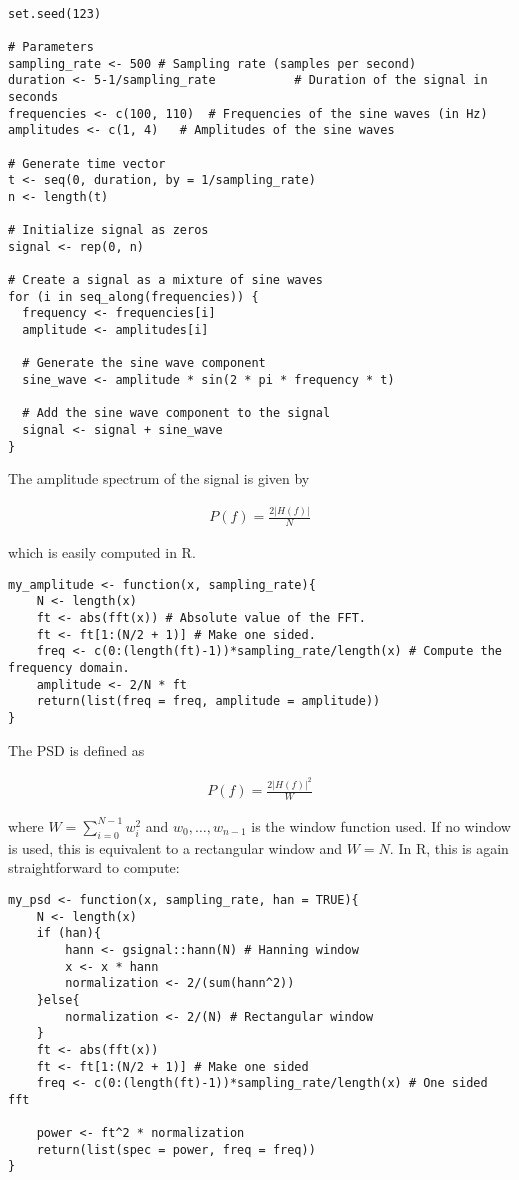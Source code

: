 \documentclass[a4paper, 12pt]{article}
\begin{document}
\begin{verbatim}
    
set.seed(123)

# Parameters
sampling_rate <- 500 # Sampling rate (samples per second)
duration <- 5-1/sampling_rate           # Duration of the signal in seconds
frequencies <- c(100, 110)  # Frequencies of the sine waves (in Hz)
amplitudes <- c(1, 4)   # Amplitudes of the sine waves

# Generate time vector
t <- seq(0, duration, by = 1/sampling_rate)
n <- length(t)

# Initialize signal as zeros
signal <- rep(0, n)

# Create a signal as a mixture of sine waves
for (i in seq_along(frequencies)) {
  frequency <- frequencies[i]
  amplitude <- amplitudes[i]
  
  # Generate the sine wave component
  sine_wave <- amplitude * sin(2 * pi * frequency * t)
  
  # Add the sine wave component to the signal
  signal <- signal + sine_wave
}

\end{verbatim}

The amplitude spectrum of the signal is given by 

\begin{align*}
    P(f) = \frac{2|H(f)|}{N}
\end{align*}

which is easily computed in R.

\begin{verbatim}
my_amplitude <- function(x, sampling_rate){
    N <- length(x)
    ft <- abs(fft(x)) # Absolute value of the FFT.
    ft <- ft[1:(N/2 + 1)] # Make one sided.
    freq <- c(0:(length(ft)-1))*sampling_rate/length(x) # Compute the frequency domain.
    amplitude <- 2/N * ft
    return(list(freq = freq, amplitude = amplitude))
}
\end{verbatim}

The PSD is defined as

\begin{align*}
    P(f) = \frac{2|H(f)|^2}{W}
\end{align*}

where $W = \sum_{i=0}^{N-1} w_i^2$ and $w_0, \ldots, w_{n-1}$ is the window
function used. If no window is used, this is equivalent to a rectangular window
and $W = N$. In R, this is again straightforward to compute:

\begin{verbatim}
my_psd <- function(x, sampling_rate, han = TRUE){
    N <- length(x)
    if (han){
        hann <- gsignal::hann(N) # Hanning window
        x <- x * hann
        normalization <- 2/(sum(hann^2)) 
    }else{
        normalization <- 2/(N) # Rectangular window
    }
    ft <- abs(fft(x)) 
    ft <- ft[1:(N/2 + 1)] # Make one sided
    freq <- c(0:(length(ft)-1))*sampling_rate/length(x) # One sided fft
    
    power <- ft^2 * normalization
    return(list(spec = power, freq = freq))
}
\end{verbatim}
\end{document}
